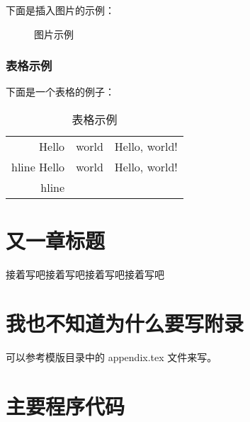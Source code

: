 \documentclass{swfcthesis}
\begin{document}
下面是插入图片的示例：

\begin{figure}[!ht]
  \centering
  \caption{图片示例}
  \label{fig:hello}
\end{figure}

\subsection{表格示例}

下面是一个表格的例子：

\begin{table}[!ht]
  \centering
  \begin{tabular}{|r|c|l|}    \hline
    Hello&world&Hello, world!\\hline
    Hello&world&Hello, world!\\hline
  \end{tabular}
  \caption{表格示例}
\end{table}

\chapter{又一章标题}

接着写吧接着写吧接着写吧接着写吧


\Appendix{}
\printbibliography[heading={bibintoc},title={参考文献}] %
\advisorinfopage{}                 %
\acknowledgmentspage{}             %


\chapter{我也不知道为什么要写附录} %

可以参考模版目录中的 appendix.tex 文件来写。

\chapter{主要程序代码} %


\begin{listing}[H]
\end{listing}  
\end{document}
